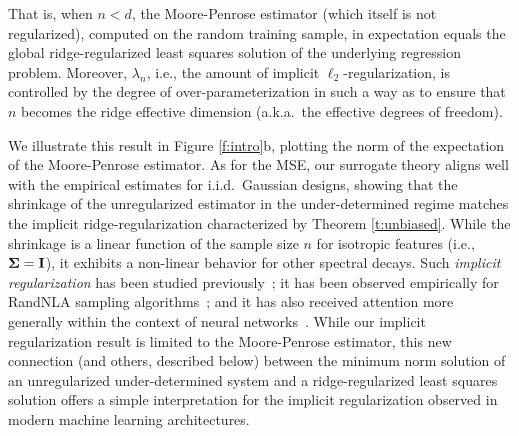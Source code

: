 \documentclass[11pt]{article}
\begin{document}
\noindent
That is, when $n < d$, the Moore-Penrose estimator (which itself is
not regularized), computed on the
random training sample, in expectation equals the global ridge-regularized least
squares solution of the underlying regression
problem. Moreover, $\lambda_n$, i.e., the amount
of implicit $\ell_2$-regularization, is controlled by the degree of
over-parameterization in such a way as to ensure that $n$ becomes the ridge effective dimension
(a.k.a.~the effective degrees of freedom).

We illustrate this result in Figure
\ref{f:intro}b, plotting the norm of the expectation of the
Moore-Penrose estimator. As for the MSE, our surrogate theory aligns
well with the empirical estimates for i.i.d.~Gaussian designs, showing
that the shrinkage of the unregularized estimator in the
under-determined regime matches the implicit
ridge-regularization characterized by Theorem \ref{t:unbiased}. While the shrinkage
is a linear function of the sample size $n$ for isotropic features
(i.e., $\mathbf{\Sigma}=\mathbf I$), it
exhibits a non-linear behavior for other spectral decays.
Such \emph{implicit regularization} has been studied
previously~\citep[see, e.g.,][]{MO11-implementing, %
Mah12}; it has
been observed empirically for RandNLA sampling
algorithms~\citep{MMY15}; and it has also received attention more
generally within the context of neural networks~\citep{Ney17_TR}. While our implicit regularization result
is limited to the Moore-Penrose estimator, this new connection (and
others, described below) between the minimum norm solution of an unregularized
under-determined system and a ridge-regularized least squares solution
offers a simple interpretation for the implicit regularization
observed in modern machine learning architectures.
\end{document}
